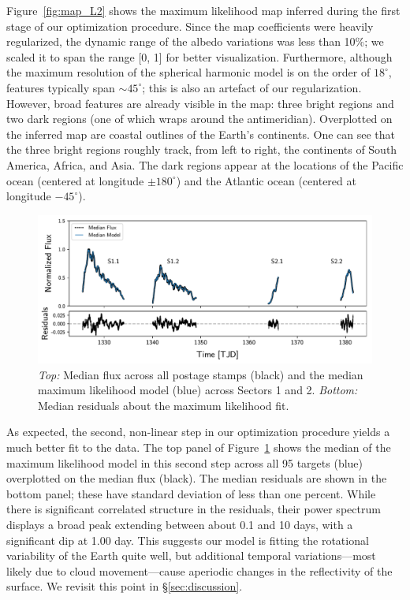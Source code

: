 \documentclass[modern]{aastex62}
\begin{document}
Figure~\ref{fig:map_L2} shows the maximum likelihood map inferred
during the first stage of our optimization procedure. Since the map
coefficients were heavily regularized, the dynamic range of the albedo
variations was less than 10\%; we scaled it to span the range [0, 1]
for better visualization. Furthermore, although the maximum resolution of
the spherical harmonic model is on 
the order of $18^\circ$, features typically span ${\sim}45^\circ$; this is
also an artefact of our regularization. However, broad features are already
visible in the map: three bright regions and two dark regions (one of which
wraps around the antimeridian). Overplotted on the inferred map are
coastal outlines of the Earth's continents. One can see that the three bright regions roughly
track, from left to right, the continents  of South America,
Africa, and Asia. The dark regions
appear at the locations of the
Pacific ocean (centered at longitude $\pm180^\circ$) and the Atlantic
ocean (centered at longitude $-45^\circ$).

\begin{figure}[t!]
    \begin{centering}
    \includegraphics[width=\linewidth]{figures/model.pdf}
    \caption{\label{fig:model}
             \emph{Top:} Median flux across all postage stamps (black) and
             the median maximum likelihood model (blue) across Sectors 1 and 2.
             \emph{Bottom:} Median residuals about the maximum likelihood fit.
             }
    \end{centering}
\end{figure}

As expected, the second, non-linear step in our optimization procedure
yields a much better fit to the data.
The top panel of Figure~\ref{fig:model} shows the median of the 
maximum likelihood model in this second step
across all 95 targets (blue) overplotted on the median flux (black). 
The median residuals are shown in the bottom panel; these have
standard deviation of less than one percent. While there is significant correlated
structure in the residuals, their power spectrum displays a broad peak extending 
between about 0.1 and 10 days, with a significant dip at 1.00 day. This
suggests our model is fitting the rotational variability of the Earth quite well, but
additional temporal variations---most likely due to cloud movement---cause aperiodic
changes in the reflectivity of the surface. We revisit this point in \S\ref{sec:discussion}.
\end{document}

